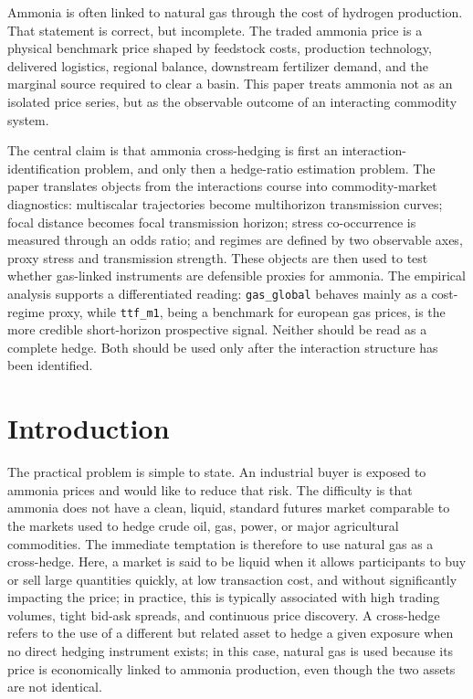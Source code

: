 \documentclass[11pt]{article}
\renewenvironment{abstract}{%
  \vspace{1.5em}
  \begin{center}
    {\large\bfseries\abstractname}
  \end{center}
  \vspace{0.8em}
  \begin{center}
    \begin{minipage}{0.82\textwidth}
      \small
}{%
    \end{minipage}
  \end{center}
}
\newcommand{\1}{\mathbf 1}
\begin{document}
\vspace{1.5em}
\begin{abstract}
Ammonia is often linked to natural gas through the cost of hydrogen production. That statement is correct, but incomplete. The traded ammonia price is a physical benchmark price shaped by feedstock costs, production technology, delivered logistics, regional balance, downstream fertilizer demand, and the marginal source required to clear a basin. This paper treats ammonia not as an isolated price series, but as the observable outcome of an interacting commodity system.

The central claim is that ammonia cross-hedging is first an interaction-identification problem, and only then a hedge-ratio estimation problem. The paper translates objects from the interactions course into commodity-market diagnostics: multiscalar trajectories become multihorizon transmission curves; focal distance becomes focal transmission horizon; stress co-occurrence is measured through an odds ratio; and regimes are defined by two observable axes, proxy stress and transmission strength. These objects are then used to test whether gas-linked instruments are defensible proxies for ammonia. The empirical analysis supports a differentiated reading: \texttt{gas\_global} behaves mainly as a cost-regime proxy, while \texttt{ttf\_m1}, being a benchmark for european gas prices, is the more credible short-horizon prospective signal. Neither should be read as a complete hedge. Both should be used only after the interaction structure has been identified.
\end{abstract}

\clearpage

\tableofcontents

\clearpage

\section{Introduction}

The practical problem is simple to state. An industrial buyer is exposed to ammonia prices and would like to reduce that risk. The difficulty is that ammonia does not have a clean, liquid, standard futures market comparable to the markets used to hedge crude oil, gas, power, or major agricultural commodities. The immediate temptation is therefore to use natural gas as a cross-hedge. Here, a market is said to be liquid when it allows participants to buy or sell large quantities quickly, at low transaction cost, and without significantly impacting the price; in practice, this is typically associated with high trading volumes, tight bid-ask spreads, and continuous price discovery. A cross-hedge refers to the use of a different but related asset to hedge a given exposure when no direct hedging instrument exists; in this case, natural gas is used because its price is economically linked to ammonia production, even though the two assets are not identical.
\end{document}
